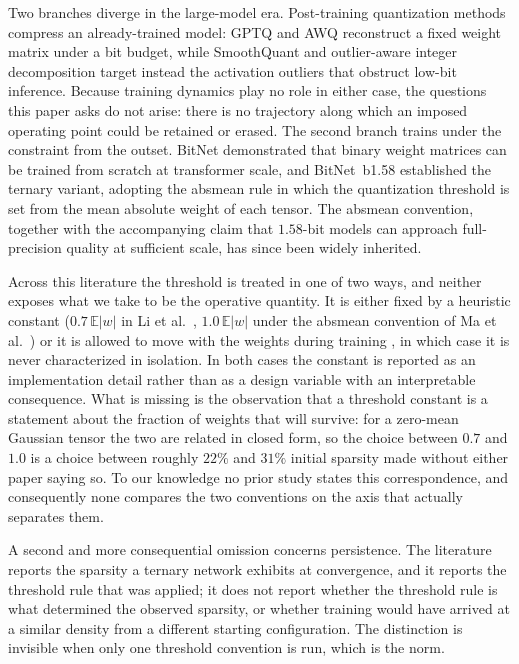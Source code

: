 \documentclass[final,5p,times,twocolumn]{elsarticle}
\theoremstyle{remark}
\newcommand{\E}{\mathbb{E}}
\begin{document}
Two branches diverge in the large-model era. Post-training quantization
methods compress an already-trained model: GPTQ \cite{frantar2023} and AWQ
\cite{lin2024} reconstruct a fixed weight matrix under a bit budget, while
SmoothQuant \cite{xiao2023} and outlier-aware integer decomposition
\cite{dettmers2022} target instead the activation outliers that obstruct
low-bit inference. Because training dynamics play no role in either case, the
questions this paper asks do not arise: there is no trajectory along which an imposed operating point could be
retained or erased. The second branch trains under the constraint from the
outset. BitNet \cite{wang2023} demonstrated that binary weight matrices can be
trained from scratch at transformer scale, and BitNet~b1.58 \cite{ma2024}
established the ternary variant, adopting the absmean rule in which the
quantization threshold is set from the mean absolute weight of each tensor.
The absmean convention, together with the accompanying claim that $1.58$-bit
models can approach full-precision quality at sufficient scale, has since been
widely inherited.

Across this literature the threshold is treated in one of two ways, and
neither exposes what we take to be the operative quantity. It is either
fixed by a heuristic constant ($0.7\,\E|w|$ in
Li et al.~\cite{li2016}, $1.0\,\E|w|$ under the absmean convention of
Ma et al.~\cite{ma2024}) or it is allowed to move with the weights during
training \cite{zhu2017a,guo2016}, in which case it is never characterized in
isolation. In both cases the constant is reported as an implementation
detail rather than as a design variable with an interpretable consequence.
What is missing is the observation that a threshold constant is a
statement about the fraction of weights that will survive: for a zero-mean
Gaussian tensor the two are related in closed form, so the choice between
$0.7$ and $1.0$ is a choice between roughly $22\%$ and $31\%$ initial sparsity
made without either paper saying so. To our knowledge no prior study states
this correspondence, and consequently none compares the two conventions on the
axis that actually separates them.

A second and more consequential omission concerns persistence. The
literature reports the sparsity a ternary network exhibits at convergence, and
it reports the threshold rule that was applied; it does not report whether the
threshold rule is what determined the observed sparsity, or whether
training would have arrived at a similar density from a different starting
configuration. The distinction is invisible when only one threshold convention
is run, which is the norm.
\end{document}
